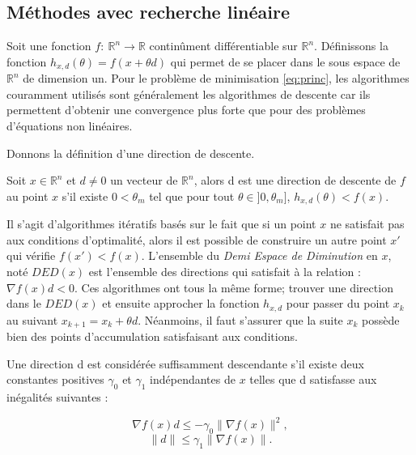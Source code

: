 \subsection{M\'ethodes avec recherche lin\'eaire}
Soit une fonction $f:\ \mathbb{R}^n \rightarrow \mathbb{R}$ continûment diff\'erentiable sur $\mathbb{R}^n$. {\co D\'efinissons
la fonction $h_{x,d}(\theta)=f(x+\theta d)$ qui permet de se placer dans le sous espace de $\mathbb{R}^n$ de dimension un.}
Pour le probl\`eme de minimisation \eqref{eq:princ}, les algorithmes couramment utilis\'es sont g\'en\'eralement les algorithmes de 
descente car ils permettent d'obtenir une convergence plus forte que pour des probl\`emes d'\'equations
non lin\'eaires.





 Donnons la d\'efinition d'une direction de descente.

\begin{frdefinition}
\label{def:1}
Soit $x \in \mathbb{R}^n$ et $d \neq 0$ un vecteur de $\mathbb{R}^n$, alors d est une direction de
descente de $f$ au point $x$ s'il existe $0<\theta_m$ tel que pour tout $\theta \in ]0,\theta_m]$,
$h_{x,d}(\theta)<f(x)$. \\
\end{frdefinition}
%
Il s'agit d'algorithmes it\'eratifs bas\'es sur le fait que si un point $x$ ne satisfait pas aux conditions d'optimalit\'e, alors il est 
possible de construire un autre point $x'$ qui v\'erifie $f(x')<f(x)$.
L'ensemble du {\it Demi Espace de Diminution} en $x$, not\'e $DED(x)$ est l'ensemble des directions qui satisfait \`a la relation :
$\nabla f(x)d<0$. Ces algorithmes ont tous la même forme;  trouver une direction dans le $DED(x)$ et 
ensuite approcher la fonction $h_{x,d}$ pour passer du point $x_k$ au suivant $x_{k+1}=x_k+\theta d$. N\'eanmoins, il faut s'assurer que la suite ${x_k}$
poss\`ede bien des points d'accumulation satisfaisant aux conditions.


\begin{frdefinition}
\label{def:2}
 Une direction d est consid\'er\'ee suffisamment descendante s'il existe deux constantes positives $\gamma_0$ et $\gamma_1$ 
 ind\'ependantes de $x$ telles que d satisfasse aux in\'egalit\'es suivantes : 

\begin{equation}  %
\label{equ:1}
\nabla f(x)d \leq -\gamma_0 \lVert \nabla f(x) \rVert^2 ,
\end{equation}
\begin{equation}
\label{equ:2}
\lVert d \rVert \leq \gamma_1 \lVert \nabla f(x) \rVert.
\end{equation}

\end{frdefinition}






